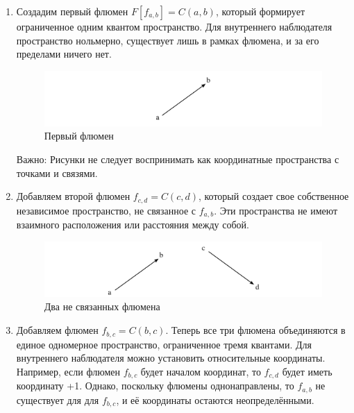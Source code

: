 \documentclass[final]{article}
\begin{document}
        \begin{enumerate}

            \item Создадим первый флюмен \( F[f_{a,b}]=C(a,b) \), который формирует 
            ограниченное одним квантом пространство. Для внутреннего наблюдателя 
            пространство нольмерно, существует лишь в рамках флюмена, и за его 
            пределами ничего нет.

            \begin{figure}[H]
                \centering
                \includegraphics[width=\textwidth]{./1d-f1.png}
                \caption{Первый флюмен}
                \label{fig:image}
            \end{figure}

            Важно: Рисунки не следует воспринимать как координатные пространства с точками
            и связями.

            \item Добавляем второй флюмен \( f_{c,d}=C(c,d) \), который создает свое 
            собственное независимое пространство, не связанное с \( f_{a,b} \). Эти 
            пространства не имеют взаимного расположения или расстояния между собой.

            \begin{figure}[H]
                \centering
                \includegraphics[width=\textwidth]{./1d-f1f2.png}
                \caption{Два не связанных флюмена}
                \label{fig:image}
            \end{figure}

            \item Добавляем флюмен \( f_{b,c}=C(b,c) \). Теперь все три флюмена 
            объединяются в единое одномерное пространство, ограниченное тремя 
            квантами. Для внутреннего наблюдателя можно установить относительные 
            координаты. Например, если флюмен \(f_{b,c}\) будет началом координат, 
            то \(f_{c,d}\) будет иметь координату +1. Однако, поскольку флюмены 
            однонаправлены, то \(f_{a,b}\) не существует для для \(f_{b,c}\), и её 
            координаты остаются неопределёнными.


\end{enumerate}
\end{document}
